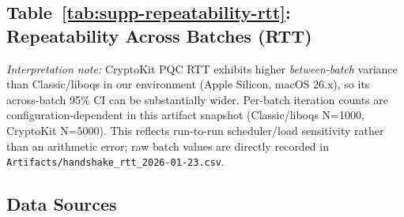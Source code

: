 \documentclass[10pt,journal,compsoc]{IEEEtran}
\begin{document}


\subsection*{Table~\ref{tab:supp-repeatability-rtt}: Repeatability Across Batches (RTT)}

\noindent\textit{Interpretation note:} CryptoKit PQC RTT exhibits higher \emph{between-batch} variance than Classic/liboqs in our environment (Apple Silicon, macOS 26.x), so its across-batch 95\% CI can be substantially wider. Per-batch iteration counts are configuration-dependent in this artifact snapshot (Classic/liboqs N=1000, CryptoKit N=5000). This reflects run-to-run scheduler/load sensitivity rather than an arithmetic error; raw batch values are directly recorded in \texttt{Artifacts/handshake\_rtt\_2026-01-23.csv}.



\subsection*{Data Sources}
\end{document}

